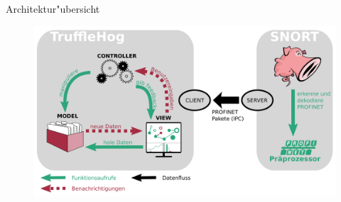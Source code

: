 \begin{frame}{Architektur"ubersicht}
	\begin{figure}
		\centering
		\includegraphics[width=\textwidth]{./images/jan_12.png}
	\end{figure}
\end{frame}
